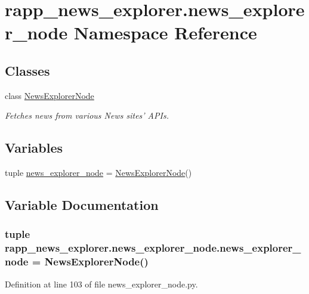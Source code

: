\hypertarget{namespacerapp__news__explorer_1_1news__explorer__node}{\section{rapp\-\_\-news\-\_\-explorer.\-news\-\_\-explorer\-\_\-node Namespace Reference}
\label{namespacerapp__news__explorer_1_1news__explorer__node}
}
\subsection*{Classes}
\begin{DoxyCompactItemize}
\item 
class \hyperlink{classrapp__news__explorer_1_1news__explorer__node_1_1NewsExplorerNode}{News\-Explorer\-Node}
\begin{DoxyCompactList}\small\item\em Fetches news from various News sites' A\-P\-Is. \end{DoxyCompactList}\end{DoxyCompactItemize}
\subsection*{Variables}
\begin{DoxyCompactItemize}
\item 
tuple \hyperlink{namespacerapp__news__explorer_1_1news__explorer__node_a97fd7e6737b76e081bc610dd41af2f95}{news\-\_\-explorer\-\_\-node} = \hyperlink{classrapp__news__explorer_1_1news__explorer__node_1_1NewsExplorerNode}{News\-Explorer\-Node}()
\end{DoxyCompactItemize}


\subsection{Variable Documentation}
\hypertarget{namespacerapp__news__explorer_1_1news__explorer__node_a97fd7e6737b76e081bc610dd41af2f95}{
\subsubsection[{news\-\_\-explorer\-\_\-node}]{\setlength{\rightskip}{0pt plus 5cm}tuple rapp\-\_\-news\-\_\-explorer.\-news\-\_\-explorer\-\_\-node.\-news\-\_\-explorer\-\_\-node = {\bf News\-Explorer\-Node}()}}\label{namespacerapp__news__explorer_1_1news__explorer__node_a97fd7e6737b76e081bc610dd41af2f95}


Definition at line 103 of file news\-\_\-explorer\-\_\-node.\-py.

